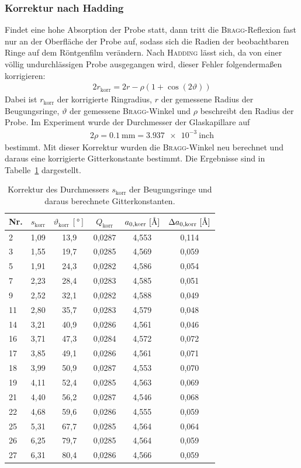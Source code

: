 \documentclass[a4paper,twoside,final]{article}
\begin{document}
\subsubsection{Korrektur nach Hadding}
Findet eine hohe Absorption der Probe statt, dann tritt die \textsc{Bragg}-Reflexion fast nur an der Oberfläche der Probe auf, sodass sich die Radien der beobachtbaren Ringe auf dem Röntgenfilm verändern. Nach \textsc{Hadding} lässt sich, da von einer völlig undurchlässigen Probe ausgegangen wird, dieser Fehler folgendermaßen korrigieren:
\begin{align}
  2r_\text{korr} = 2r - \rho (1+\cos(2\vartheta))
\end{align}
Dabei ist $r_\text{korr}$ der korrigierte Ringradius, $r$ der gemessene Radius der Beugungsringe, $\vartheta$ der gemessene \textsc{Bragg}-Winkel und $\rho$ beschreibt den Radius der Probe. Im Experiment wurde der Durchmesser der Glaskapillare auf
\begin{align}
  2\rho = \SI{0,1}{\milli\metre} = \SI{3,937e-3}{\text{inch}}
\end{align}
bestimmt. Mit dieser Korrektur wurden die \textsc{Bragg}-Winkel neu berechnet und daraus eine korrigierte Gitterkonstante bestimmt. Die Ergebnisse sind in Tabelle~\ref{tab:Hadding} dargestellt.
\begin{table}[ht]
	\centering
	\caption{Korrektur des Durchmessers $s_\text{korr}$ der Beugungsringe und daraus berechnete Gitterkonstanten.}
	\label{tab:Hadding}
	\begin{tabular}{l c c c c c}
		\toprule
      Nr. & $s_\text{korr}$ & $\vartheta_\text{korr}~[\si{\degree}]$ & $Q_\text{korr}$ & $a_{0,\text{korr}}~[\si{\textup{\AA}}]$ & $\Delta a_{0,\text{korr}}~[\si{\textup{\AA}}]$\\
    \midrule
    2  & 1,09 & 13,9 & 0,0287 & 4,553 & 0,114 \\
    3  & 1,55 & 19,7 & 0,0285 & 4,569 & 0,059 \\
    5  & 1,91 & 24,3 & 0,0282 & 4,586 & 0,054 \\
    7  & 2,23 & 28,4 & 0,0283 & 4,585 & 0,051 \\
    9  & 2,52 & 32,1 & 0,0282 & 4,588 & 0,049 \\
    11 & 2,80 & 35,7 & 0,0283 & 4,579 & 0,048 \\
    14 & 3,21 & 40,9 & 0,0286 & 4,561 & 0,046 \\
    16 & 3,71 & 47,3 & 0,0284 & 4,572 & 0,072 \\
    17 & 3,85 & 49,1 & 0,0286 & 4,561 & 0,071 \\
    18 & 3,99 & 50,9 & 0,0287 & 4,553 & 0,070 \\
    19 & 4,11 & 52,4 & 0,0285 & 4,563 & 0,069 \\
    21 & 4,40 & 56,2 & 0,0287 & 4,546 & 0,068 \\
    22 & 4,68 & 59,6 & 0,0286 & 4,555 & 0,059 \\
    25 & 5,31 & 67,7 & 0,0285 & 4,564 & 0,064 \\
    26 & 6,25 & 79,7 & 0,0285 & 4,564 & 0,059 \\
    27 & 6,31 & 80,4 & 0,0286 & 4,566 & 0,059
	\end{tabular}
\end{table}
\end{document}
